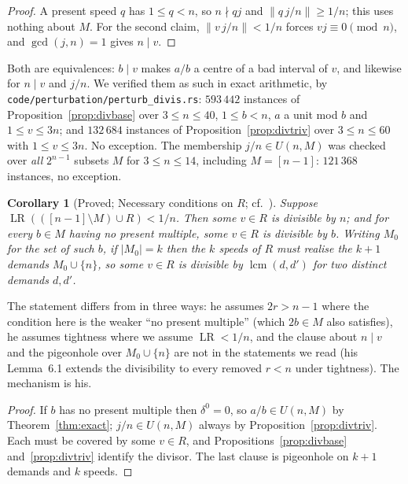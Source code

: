 \documentclass[11pt]{amsart}
\theoremstyle{plain}
\newtheorem{corollary}[theorem]{Corollary}
\theoremstyle{definition}
\newcommand{\LR}{\operatorname{LR}}
\newcommand{\nrm}[1]{\left\lVert #1 \right\rVert}
\begin{document}
\begin{proof}
A present speed $q$ has $1\le q<n$, so $n\nmid qj$ and $\nrm{q\,j/n}\ge1/n$; this uses nothing about
$M$. For the second claim, $\nrm{v\,j/n}<1/n$ forces $vj\equiv0\pmod n$, and $\gcd(j,n)=1$ gives
$n\mid v$.
\end{proof}

Both are equivalences: $b\mid v$ makes $a/b$ a centre of a bad interval of $v$, and likewise for
$n\mid v$ and $j/n$. We verified them as such in exact arithmetic, by
\texttt{code/perturbation/perturb\_divis.rs}: $593\,442$ instances of Proposition~\ref{prop:divbase} over
$3\le n\le40$, $1\le b<n$, $a$ a unit mod $b$ and $1\le v\le 3n$; and $132\,684$ instances of
Proposition~\ref{prop:divtriv} over $3\le n\le60$ with $1\le v\le 3n$. No exception. The membership
$j/n\in U(n,M)$ was checked over \emph{all} $2^{n-1}$ subsets $M$ for $3\le n\le14$, including
$M=[n-1]$: $121\,368$ instances, no exception.

\begin{corollary}[Proved; Necessary conditions on $R$; cf.\ ]\label{cor:divnec}
Suppose $\LR(([n-1]\setminus M)\cup R)<1/n$. Then some $v\in R$ is divisible by $n$; and for every
$b\in M$ having no present multiple, some $v\in R$ is divisible by $b$. Writing $M_0$ for the set of
such $b$, if $|M_0|=k$ then the $k$ speeds of $R$ must realise the $k+1$ demands $M_0\cup\{n\}$, so
some $v\in R$ is divisible by $\operatorname{lcm}(d,d')$ for two distinct demands $d,d'$.
\end{corollary}

The statement differs from \cite[Lemma~2.3]{zhang} in three ways: he assumes $2r>n-1$ where the
condition here is the weaker ``no present multiple'' (which $2b\in M$ also satisfies), he assumes
tightness where we assume $\LR<1/n$, and the clause about $n\mid v$ and the pigeonhole over
$M_0\cup\{n\}$ are not in the statements we read (his Lemma~6.1 extends the divisibility to every
removed $r<n$ under tightness). The mechanism is his.

\begin{proof}
If $b$ has no present multiple then $\delta^{0}=0$, so $a/b\in U(n,M)$ by Theorem~\ref{thm:exact};
$j/n\in U(n,M)$ always by Proposition~\ref{prop:divtriv}. Each must be covered by some $v\in R$, and
Propositions~\ref{prop:divbase} and~\ref{prop:divtriv} identify the divisor. The last clause is
pigeonhole on $k+1$ demands and $k$ speeds.
\end{proof}
\end{document}
